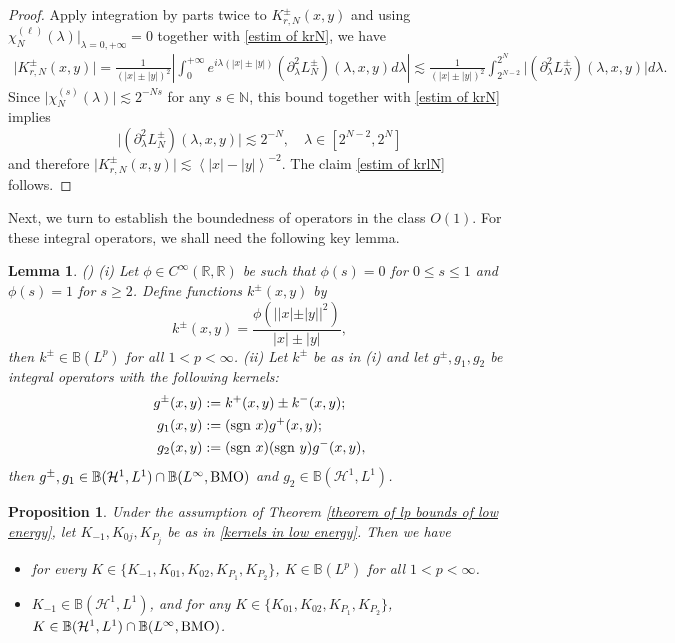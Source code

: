 \documentclass[reqno]{amsart}
\newtheorem{lemma}[definition]{Lemma}
\newtheorem{proposition}[definition]{Proposition}
\newcommand\R{\mathbb{R}}
\newcommand\B{\mathbb{B}}
\newcommand\N{\mathbb{N}}
\newcommand\HH{\mathcal{H}}
\numberwithin{equation}{section}
\begin{document}
\begin{proof}
Apply integration by parts twice to $K^{\pm}_{r,N}(x,y)$ and using ${\chi}^{(\ell)}_N(\lambda)\big|_{\lambda=0,+\infty}=0$ together with \eqref{estim of krN}, we have
\begin{align*}
\big|K^{\pm}_{r,N}(x,y)\big|=\frac{1}{(|x|\pm|y|)^2}\left|\int_{0}^{+\infty}e^{i\lambda(|x|\pm |y|)}(\partial^2_{\lambda}L^{\pm}_{N})(\lambda,x,y)d\lambda\right|\lesssim\frac{1}{(|x|\pm |y|)^2}\int_{2^{N-2}}^{2^N}\big|(\partial^2_{\lambda}L^{\pm}_{N})(\lambda,x,y)\big|d\lambda.
\end{align*}
Since
$\big|{\chi}^{(s)}_{N}(\lambda)\big|\lesssim2^{-Ns}$ for any $s\in\N$,
this bound together with \eqref{estim of krN} implies 
$$\big|(\partial^2_{\lambda}L^{\pm}_{N})(\lambda,x,y)\big|\lesssim 2^{-N},\quad \lambda\in[2^{N-2},2^N]$$
and therefore $\big|K^{\pm}_{r,N}(x,y)\big|\lesssim \left<|x|-|y|\right>^{-2}.$ The claim \eqref{estim of krlN} follows.
\end{proof}
Next, we turn to establish the boundedness of operators in the class $O(1)$. For these integral operators, we shall need the following key lemma.
\begin{lemma}\label{C-Z lemma}
{\rm(\cite[Lemma 3.3 and Lemma 3.6]{MWY24})}
{\rm (i)} Let $\phi \in C^{\infty}(\R,\R)$ be such that $\phi(s)=0$ for $0\leq s\leq1$ and $\phi(s)=1$ for $s\geq2$. Define functions $k^{\pm}(x,y)$ by
\begin{equation*}
k^{\pm}(x,y)=\frac{\phi(||x|\pm|y||^2)}{|x|\pm |y|},
\end{equation*}
 then  ${k^{\pm}}\in\B(L^p)$ for all $1<p<\infty$. 
\vskip0.2cm
{\rm(ii)} Let $k^{\pm}$ be as in {\rm(i)} and let $g^{\pm},g_1,g_2$ be integral operators with the following kernels:
\begin{align*}
g^{\pm}(x,y)&:=k^{+}(x,y)\pm k^{-}(x,y);\\
g_{1}(x,y)&:=({\rm sgn}~x)g^+(x,y);\\
g_{2}(x,y)&:=({\rm sgn}~x)({\rm sgn}~y)g^{-}(x,y),
\end{align*}
then $g^{\pm},g_1\in\B(\HH^1,L^1)\cap\B(L^{\infty},{\rm BMO})$ and $g_2\in \B(\HH^1,L^1)$.
\end{lemma}
\begin{proposition}\label{bounds of Ptuta}
Under the assumption of Theorem {\rm\ref{theorem of lp bounds of low energy}}, let $K_{-1},K_{0j},K_{P_j}$ be as in \eqref{kernels in low energy}. Then we have
\begin{itemize}
    \item [{\rm (1)}] for every $K\in\{K_{-1},K_{01},K_{02},K_{{P_1}},K_{{P_2}}\}$, $K\in\B(L^p)$ for all $1<p<\infty$.
    \item [{\rm (2)}] $K_{-1}\in\B(\HH^1,L^1)$, and for any $K\in \{K_{01},K_{02},K_{{P_1}},K_{{P_2}}\}$, $K\in \B(\HH^1,L^1)\cap\B(L^{\infty},{\rm BMO})$.
\end{itemize}
\end{proposition}
\end{document}
